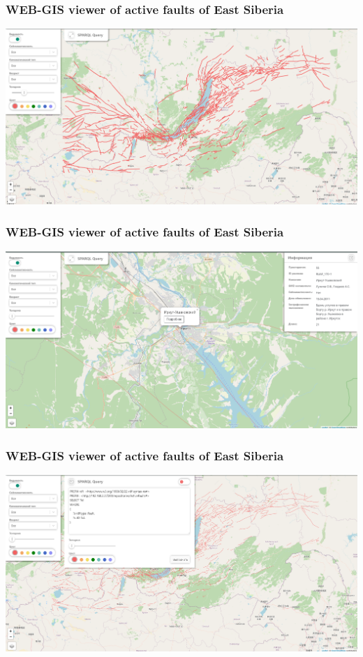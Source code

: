 \documentclass[10pt]{beamer}
\begin{document}
\begin{frame}
  \frametitle{WEB-GIS viewer of active faults of East Siberia}
  \centering
  \includegraphics[width=\linewidth]{faults-leaflet-all.png}
\end{frame}

\begin{frame}
  \frametitle{WEB-GIS viewer of active faults of East Siberia}
  \centering
  \includegraphics[width=\linewidth]{faults-leaflet-doc.png}
\end{frame}

\begin{frame}
  \frametitle{WEB-GIS viewer of active faults of East Siberia}
  \centering
  \includegraphics[width=\linewidth]{faults-leaflet-sparql.png}
\end{frame}
\end{document}

